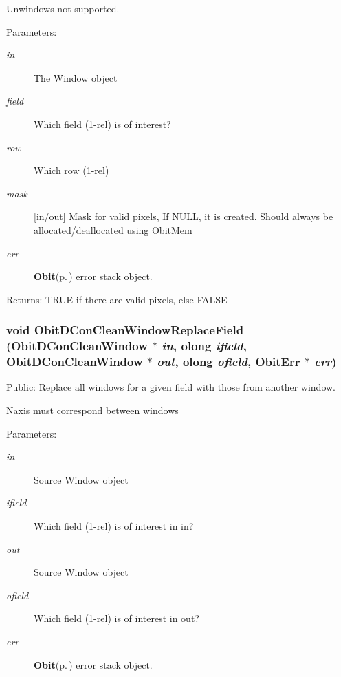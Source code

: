 Unwindows not supported. \begin{Desc}
\item[Parameters:]
\begin{description}
\item[{\em in}]The Window object \item[{\em field}]Which field (1-rel) is of interest? \item[{\em row}]Which row (1-rel) \item[{\em mask}][in/out] Mask for valid pixels, If NULL, it is created. Should always be allocated/deallocated using Obit\-Mem \item[{\em err}]{\bf Obit}{\rm (p.\,\pageref{structObit})} error stack object. \end{description}
\end{Desc}
\begin{Desc}
\item[Returns:]TRUE if there are valid pixels, else FALSE \end{Desc}
\subsubsection{\setlength{\rightskip}{0pt plus 5cm}void Obit\-DCon\-Clean\-Window\-Replace\-Field ({\bf Obit\-DCon\-Clean\-Window} $\ast$ {\em in}, {\bf olong} {\em ifield}, {\bf Obit\-DCon\-Clean\-Window} $\ast$ {\em out}, {\bf olong} {\em ofield}, {\bf Obit\-Err} $\ast$ {\em err})}\label{ObitDConCleanWindow_8h_a46}


Public: Replace all windows for a given field with those from another window. 

Naxis must correspond between windows \begin{Desc}
\item[Parameters:]
\begin{description}
\item[{\em in}]Source Window object \item[{\em ifield}]Which field (1-rel) is of interest in in? \item[{\em out}]Source Window object \item[{\em ofield}]Which field (1-rel) is of interest in out? \item[{\em err}]{\bf Obit}{\rm (p.\,\pageref{structObit})} error stack object. \end{description}
\end{Desc}
